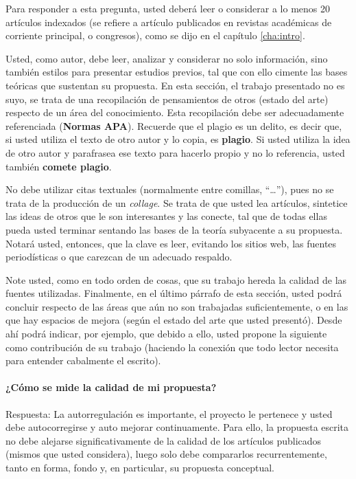 Para responder a esta pregunta, usted deberá leer o considerar a lo menos 20 artículos indexados (se refiere a artículo publicados en revistas académicas de corriente principal, o congresos), como se dijo en el capítulo \ref{cha:intro}.

Usted, como autor, debe leer, analizar y considerar no solo información, sino también estilos para presentar estudios previos, tal que con ello cimente las bases teóricas que sustentan su propuesta. En esta sección, el trabajo presentado no es suyo, se trata de una recopilación de pensamientos de otros (estado del arte) respecto de un área del conocimiento. Esta recopilación debe ser adecuadamente referenciada (\textbf{Normas APA}). Recuerde que el plagio es un delito, es decir que, si usted utiliza el texto de otro autor y lo copia, es \textbf{plagio}. Si usted utiliza la idea de otro autor y parafrasea ese texto para hacerlo propio y no lo referencia, usted también \textbf{comete plagio}. 

No debe utilizar citas textuales (normalmente entre comillas, ``\ldots''), pues no se trata de la producción de un \textit{collage}. Se trata de que usted lea artículos, sintetice las ideas de otros que le son interesantes y las conecte, tal que de todas ellas pueda usted terminar sentando las bases de la teoría subyacente a su propuesta. Notará usted, entonces, que la clave es leer, evitando los sitios web, las fuentes periodísticas o que carezcan de un adecuado respaldo.

Note usted, como en todo orden de cosas, que su trabajo hereda la calidad de las fuentes utilizadas.
Finalmente, en el último párrafo de esta sección, usted podrá concluir respecto de las áreas que aún no son trabajadas suficientemente, o en las que hay espacios de mejora (según el estado del arte que usted presentó). Desde ahí podrá indicar, por ejemplo, que debido a ello, usted propone la siguiente como contribución de su trabajo (haciendo la conexión que todo lector necesita para entender cabalmente el escrito).

\paragraph{¿Cómo se mide la calidad de mi propuesta?}

Respuesta: La autorregulación es importante, el proyecto le pertenece y usted debe au\-to\-co\-rre\-gir\-se y auto mejorar continuamente. Para ello, la propuesta escrita no debe alejarse significativamente de la calidad de los artículos publicados (mismos que usted considera), luego solo debe compararlos recurrentemente, tanto en forma, fondo y, en particular, su propuesta conceptual.

